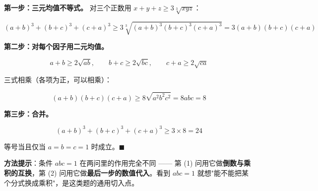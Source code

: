 
\textbf{第一步：三元均值不等式。} 对三个正数用 $x+y+z\ge3\sqrt[3]{xyz}$：

\[(a+b)^{3}+(b+c)^{3}+(c+a)^{3}\ge3\sqrt[3]{(a+b)^{3}(b+c)^{3}(c+a)^{3}}=3(a+b)(b+c)(c+a)\]

\textbf{第二步：对每个因子用二元均值。}

\[a+b\ge2\sqrt{ab},\qquad b+c\ge2\sqrt{bc},\qquad c+a\ge2\sqrt{ca}\]

三式相乘（各项为正，可以相乘）：

\[(a+b)(b+c)(c+a)\ge8\sqrt{a^{2}b^{2}c^{2}}=8abc=8\]

\textbf{第三步：合并。}

\[(a+b)^{3}+(b+c)^{3}+(c+a)^{3}\ge3\times8=24\]

等号当且仅当 $a=b=c=1$ 时成立。$\blacksquare$

\begin{gktip}
\textbf{方法提示}：条件 $abc=1$ 在两问里的作用完全不同 —— 第 (1) 问用它做\textbf{倒数与乘积的互换}，第 (2) 问用它做\textbf{最后一步的数值代入}。看到 $abc=1$ 就想"能不能把某个分式换成乘积"，是这类题的通用切入点。
\end{gktip}

\par\medskip

